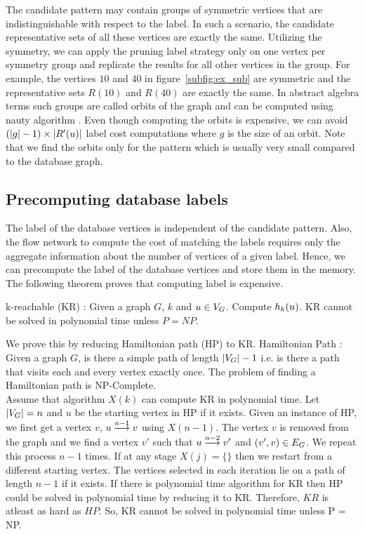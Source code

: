  The candidate pattern may contain groups of
symmetric vertices that are indistinguishable with respect to the \khop label.
In such a scenario, the candidate representative sets of all these vertices are
exactly the same. Utilizing the symmetry, we can apply the pruning label strategy only on
one vertex per symmetry group and replicate the results for all other vertices
in the group. For example, the vertices $10$ and $40$ in
figure~\ref{subfig:ex_sub} are symmetric and the representative sets $R(10)$
and $R(40)$ are exactly the same.  In abstract algebra terms such  groups are
called orbits of the graph and can be computed using nauty algorithm
\cite{nauty}. 
Even
though computing the orbits is expensive, we can avoid $ (|g|-1) \times |\CR|$
\ncl label cost computations where $g$ is the size of an orbit. Note that
we find the orbits only for the pattern which is usually very small compared
to the database graph.

\subsection{Precomputing database \khop labels} The \khop label of the database
vertices is independent of the candidate pattern.
Also, the flow network to compute the cost of matching the \khop labels requires
only the aggregate information about the number of vertices of a given label.
Hence, we can precompute the \khop label of the database vertices and store them
in the memory. The following theorem proves that computing \khop label is
expensive.

\begin{thm} k-reachable (KR) : Given a graph $G$, $k$ and $u \in \vg$. Compute
    $\khopl{k}{u}$.  KR cannot be solved in polynomial time unless $P =
    NP$.

\begin{myproof} We prove this by reducing Hamiltonian path (HP) to KR.
    Hamiltonian Path : Given a graph $G$, is there a simple path of length
    $|\vg|-1$ i.e. is there a path that visits each and every vertex exactly
    once. The problem of finding a Hamiltonian path is 
    NP-Complete.\\ Assume that algorithm $X(k)$ can
    compute KR in polynomial time. Let $|\vg| = n$ and $u$ be the starting
    vertex in HP if it exists.  Given an instance of HP, we first get a vertex
    $v$, $\kpath{u}{v}{n-1}$ using $X(n-1)$. The vertex $v$ is removed from the
    graph and we find a vertex $v'$ such that $\kpath{u}{v'}{n-2}$ and $(v', v)
    \in \eg$. We repeat this process $n-1$ times. If at any stage $X(j) = \{\}$
    then we restart from a different starting vertex. The vertices selected in
    each iteration lie on a path of length $n-1$ if it exists. If there is
    polynomial time algorithm for KR then HP could be solved in polynomial time
    by reducing it to KR. Therefore, $KR$ is atleast as hard as $HP$.
    So, KR cannot be solved in polynomial time unless
    P = NP.
\end{myproof}
\end{thm}

